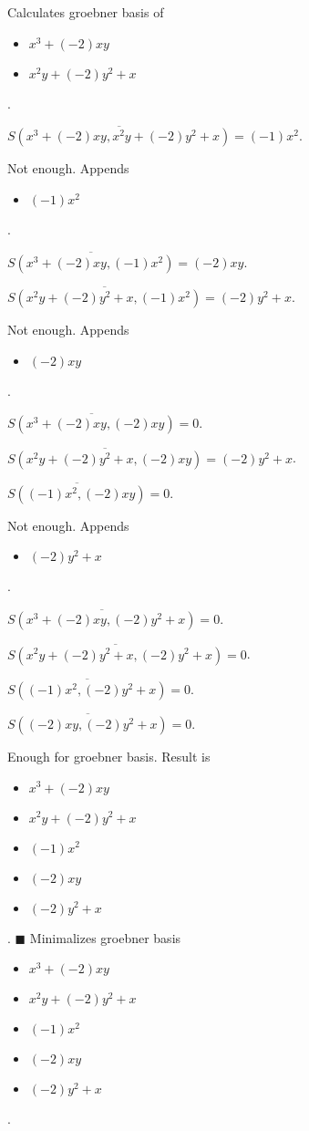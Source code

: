 \documentclass{jsarticle}
\begin{document}
Calculates groebner basis of 
\begin{itemize}
\item $x^{3}+(-2)xy$
\item $x^{2}y+(-2)y^{2}+x$
\end{itemize}  . 


$\overline{S(x^{3}+(-2)xy, x^{2}y+(-2)y^{2}+x)} = (-1)x^{2}$.  

Not enough.  Appends \begin{itemize}
\item $(-1)x^{2}$
\end{itemize}  . 


$\overline{S(x^{3}+(-2)xy, (-1)x^{2})} = (-2)xy$.  

$\overline{S(x^{2}y+(-2)y^{2}+x, (-1)x^{2})} = (-2)y^{2}+x$.  

Not enough.  Appends \begin{itemize}
\item $(-2)xy$
\end{itemize}  . 


$\overline{S(x^{3}+(-2)xy, (-2)xy)} = 0$.  

$\overline{S(x^{2}y+(-2)y^{2}+x, (-2)xy)} = (-2)y^{2}+x$.  

$\overline{S((-1)x^{2}, (-2)xy)} = 0$.  

Not enough.  Appends \begin{itemize}
\item $(-2)y^{2}+x$
\end{itemize}  . 


$\overline{S(x^{3}+(-2)xy, (-2)y^{2}+x)} = 0$.  

$\overline{S(x^{2}y+(-2)y^{2}+x, (-2)y^{2}+x)} = 0$.  

$\overline{S((-1)x^{2}, (-2)y^{2}+x)} = 0$.  

$\overline{S((-2)xy, (-2)y^{2}+x)} = 0$.  

Enough for groebner basis.  Result is \begin{itemize}
\item $x^{3}+(-2)xy$
\item $x^{2}y+(-2)y^{2}+x$
\item $(-1)x^{2}$
\item $(-2)xy$
\item $(-2)y^{2}+x$
\end{itemize}  . 
$\blacksquare{}$
Minimalizes groebner basis 
\begin{itemize}
\item $x^{3}+(-2)xy$
\item $x^{2}y+(-2)y^{2}+x$
\item $(-1)x^{2}$
\item $(-2)xy$
\item $(-2)y^{2}+x$
\end{itemize}  . 
\end{document}
